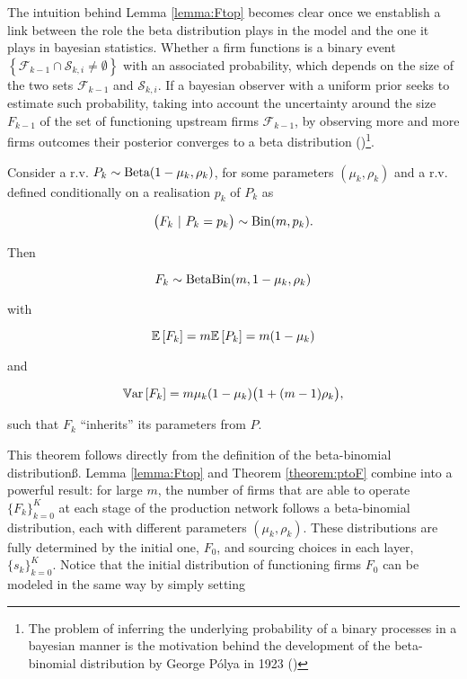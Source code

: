 \documentclass[../../main.tex]{subfiles}
\begin{document}
The intuition behind Lemma \ref{lemma:Ftop} becomes clear once we enstablish a link between the role the beta distribution plays in the model and the one it plays in bayesian statistics. Whether a firm functions is a binary event $\left\{\mathcal{F}_{k - 1} \cap \mathcal{S}_{k, i} \neq \emptyset \right\}$ with an associated probability, which depends on the size of the two sets $\mathcal{F}_{k - 1}$ and $\mathcal{S}_{k, i}$. If a bayesian observer with a uniform prior seeks to estimate such probability, taking into account the uncertainty around the size $F_{k - 1}$ of the set of functioning upstream firms $\mathcal{F}_{k - 1}$, by observing more and more firms outcomes their posterior converges to a beta distribution (\cite{gelman_bayesian_2004})\footnote{ The problem of inferring the underlying probability of a binary processes in a bayesian manner is the motivation behind the development of the beta-binomial distribution by George Pólya in 1923 (\cite{feller_introduction_1968}) }.


\begin{theorem} \label{theorem:ptoF}
  Consider a r.v. $P_k \sim \text{Beta}(1 - \mu_k, \rho_k)$, for some parameters $(\mu_k, \rho_k)$ and a r.v. defined conditionally on a realisation $p_k$ of $P_k$ as 
  
  \begin{equation}
    \big(F_k \ \vert \ P_k = p_k \big) \sim \text{Bin}(m, p_k).
  \end{equation}

  Then

  \begin{equation}
    F_k \sim \text{Beta}\text{Bin}(m, 1 - \mu_k, \rho_k)
  \end{equation}

  with

  \begin{equation} \label{eq:mean_of_F}
    \mathbb{E} \left[F_k\right] = m \mathbb{E} \left[P_k\right] = m (1 - \mu_k)
  \end{equation}

  and 

  \begin{equation} \label{eq:var_of_F}
    \mathbb{V}\text{ar} \left[F_k\right] = m \mu_k (1 - \mu_k) \big(1 + (m - 1) \rho_k\big),
  \end{equation}

  such that $F_k$ ``inherits'' its parameters from $P$.
\end{theorem}

This theorem follows directly from the definition of the beta-binomial distributionß. Lemma \ref*{lemma:Ftop} and Theorem \ref*{theorem:ptoF} combine into a powerful result: for large $m$, the number of firms that are able to operate $\{F_k\}^{K}_{k = 0}$ at each stage of the production network follows a beta-binomial distribution, each with different parameters $(\mu_k, \rho_k)$. These distributions are fully determined by the initial one, $F_0$, and sourcing choices in each layer, $\{s_k\}^{K}_{k = 0}$. Notice that the initial distribution of functioning firms $F_0$ can be modeled in the same way by simply setting 
\end{document}
